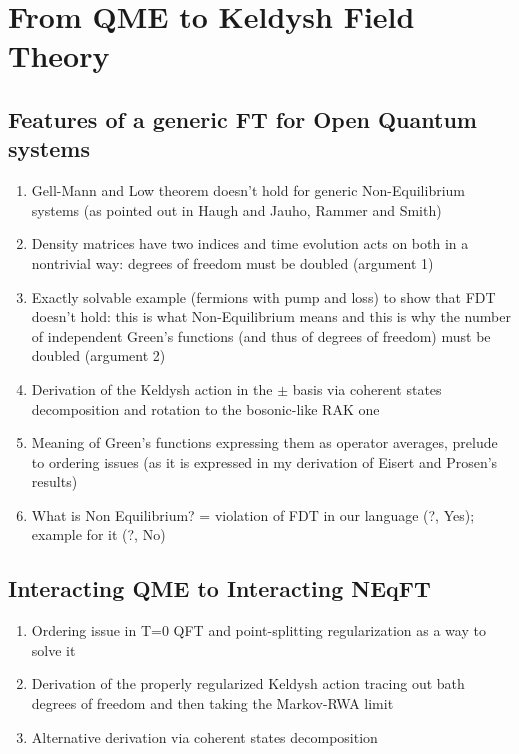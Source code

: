 \documentclass[a4paper,10pt]{article}
\theoremstyle{remark}
\begin{document}
 \section{From QME to Keldysh Field Theory}
  \subsection{Features of a generic FT for Open Quantum systems}
   \begin{enumerate}
    \item Gell-Mann and Low theorem doesn't hold for generic Non-Equilibrium systems (as pointed out in Haugh and Jauho, Rammer and Smith)
    \item Density matrices have two indices and time evolution acts on both in a nontrivial way: degrees of freedom must be doubled (argument 1)
    \item Exactly solvable example (fermions with pump and loss) to show that FDT doesn't hold: this is what Non-Equilibrium means and this is why the number of independent Green's functions (and thus of degrees of freedom) must be doubled (argument 2) 
    \item Derivation of the Keldysh action in the $\pm$ basis  via coherent states decomposition and rotation to the bosonic-like RAK one
    \item Meaning of Green's functions expressing them as operator averages, prelude to ordering issues (as it is expressed in my derivation of Eisert and Prosen's results)
    \item What is Non Equilibrium? = violation of FDT in our language (?, Yes); example for it (?, No)
   \end{enumerate}
  \subsection{Interacting QME to Interacting NEqFT}
   \begin{enumerate}
    \item Ordering issue in T=0 QFT and point-splitting regularization as a way to solve it 
    \item Derivation of the properly regularized Keldysh action tracing out bath degrees of freedom and then taking the Markov-RWA limit
    \item Alternative derivation via coherent states decomposition      
   \end{enumerate}
\end{document}
